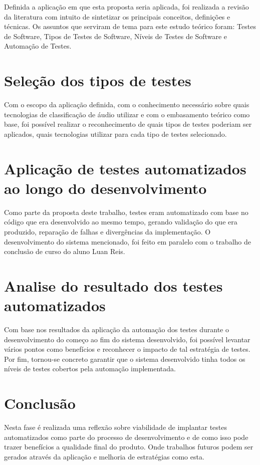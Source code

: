 Definida a aplicação em que esta proposta seria aplicada, foi realizada a revisão da literatura com intuito de sintetizar os principais conceitos, definições e técnicas. Os assuntos que serviram de tema para este estudo teórico foram: Testes de Software, Tipos de Testes de Software, Níveis de Testes de Software e Automação de Testes.

\section{Seleção dos tipos de testes}

Com o escopo da aplicação definida, com o conhecimento necessário sobre quais tecnologias de classificação de áudio utilizar e com o embasamento teórico como base, foi possível realizar o reconhecimento de quais tipos de testes poderiam ser aplicados, quais tecnologias utilizar para cada tipo de testes selecionado. 

\section{Aplicação de testes automatizados ao longo do desenvolvimento}

Como parte da proposta deste trabalho, testes eram automatizado com base no código que era desenvolvido ao mesmo tempo, gerando validação do que era produzido, reparação de falhas e divergências da implementação. O desenvolvimento do sistema mencionado, foi feito em paralelo com o  trabalho de conclusão de curso do aluno Luan Reis.

\section{Analise do resultado dos testes automatizados}

Com base nos resultados da aplicação da automação dos testes durante o desenvolvimento do começo ao fim do sistema desenvolvido, foi possível levantar vários pontos como benefícios e reconhecer o impacto de tal estratégia de testes. Por fim, tornou-se concreto garantir que o sistema desenvolvido tinha todos os níveis de testes cobertos pela automação implementada. 

\section{Conclusão}

Nesta fase é realizada uma reflexão sobre viabilidade de implantar testes automatizados como parte do processo de desenvolvimento e de como isso pode trazer benefícios a qualidade final do produto.  Onde trabalhos futuros podem ser gerados através da aplicação e melhoria de estratégias como esta. 